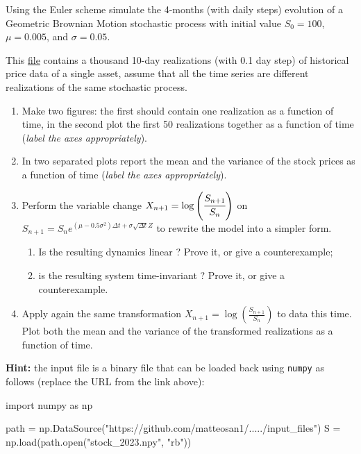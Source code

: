 \documentclass[12pt,a4paper]{article}
\begin{document}
\begin{question}
Using the Euler scheme simulate the 4-months (with daily steps) evolution of a Geometric Brownian Motion stochastic process with initial value $S_0=100$, $\mu=0.005$, and $\sigma=0.05$.
\end{question}

\cprotEnv\begin{question}
This \href{https://github.com/matteosan1/advanced_financial_modeling/raw/master/input_files}{file} contains a thousand 10-day realizations (with 0.1 day step) of historical price data of a single asset, assume that all the time series are different realizations of the same stochastic process.
\begin{enumerate}
\item Make two figures: the first should contain one realization as a function of time, in the second plot the first 50 realizations together as a function of time (\emph{label the axes appropriately}).
\item In two separated plots report the mean and the variance of the stock prices as a function of time (\emph{label the axes appropriately}).
\item Perform the variable change $X_{n+1}=\log\left(\cfrac{S_{n+1}}{S_n}\right)$ on $S_{n+1} = S_ne^{(\mu-0.5\sigma^2)\Delta t + \sigma\sqrt{\Delta t}Z}$ to rewrite the model into a simpler form. 
	\begin{enumerate}
	\item Is the resulting dynamics linear ? Prove it, or give a counterexample; 
	\item is the resulting system time-invariant ? Prove it, or give a counterexample.
	\end{enumerate}
\item Apply again the same transformation $X_{n+1}=\log\left(\frac{S_{n+1}}{S_n}\right)$ to data this time. Plot both the mean and the variance of the transformed realizations as a function of time.
\end{enumerate}

\noindent
\textbf{Hint:} the input file is a binary file that can be loaded back using \texttt{numpy} as follows (replace the URL from the link above):
\begin{ipython}
import numpy as np

path = np.DataSource("https://github.com/matteosan1/...../input_files")
S = np.load(path.open("stock_2023.npy", "rb"))
\end{ipython}
\end{question}
\end{document}

